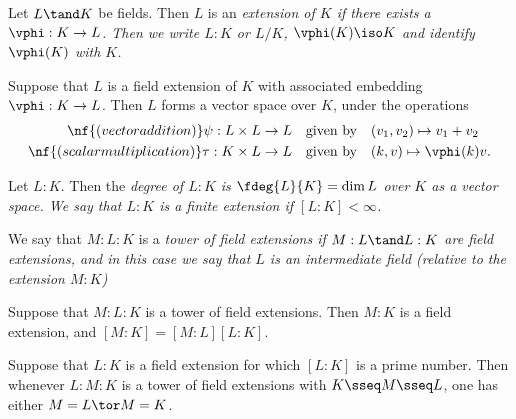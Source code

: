 \documentclass[a4paper]{article}
\begin{document}
\begin{tdefinition}
  Let \( L \tand K \) be fields.
  Then \( L \) is an \it{extension} of \( K \) if there exists a \homo~\( \vphi: K \to L \).
  Then we write \( L:K \) or \( L/K \), \( \vphi(K)\iso K \) and identify \( \vphi(K) \) with \( K \).
\end{tdefinition}

\quad Suppose that \( L \) is a field extension of \( K \) with associated embedding \( \vphi: K \to L \).
  Then \( L \) forms a vector space over \( K \), under the operations \begin{align*}
    \nf{(vector addition) } \psi: L\times L &\to L \quad \text{given by} \quad (v_1,v_2) \mapsto v_1 + v_2 \\
    \nf{(scalar multiplication) } \tau : K\times  L &\to L \quad \text{given by} \quad (k,v) \mapsto \vphi(k)v.
  \end{align*}

\begin{tdefinition}
  Let \( L: K \).
  Then the \it{degree} of \( L: K \) is \( \fdeg{L}{K}=\dim L \) over \( K \) as a vector space.
  We say that \( L : K \) is a \it{finite extension} if \( [L: K] <\infty \).
\end{tdefinition}

\begin{tdefinition}
  We say that \( M : L : K \) is a \it{tower} of field extensions if \( M : L \tand L: K \) are field extensions, and in this case we say that \( L \) is an \it{intermediate field} (relative to the extension \( M : K \))
\end{tdefinition}

\begin{ttheorem}
  Suppose that \( M :L: K \) is a tower of field extensions.
  Then \( M : K \) is a field extension, and \( [M : K] = [M : L][L: K] \).
\end{ttheorem}

\begin{tcorollary}
  Suppose that \( L:K \) is a field extension for which \( [L: K] \) is a prime number.
  Then whenever \( L : M : K \) is a tower of field extensions with \( K \sseq M \sseq L \), one has either \( M= L \tor M= K \).
\end{tcorollary}
\end{document}
